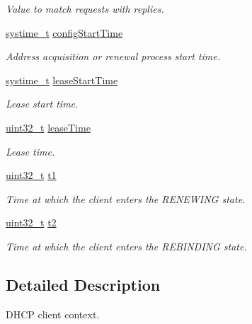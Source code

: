 \begin{DoxyCompactItemize}
\begin{DoxyCompactList}\small\item\em Value to match requests with replies. \end{DoxyCompactList}\item 
\hyperlink{compiler__port_8h_ae3e32a98d431a02106616da3071832dd}{systime\+\_\+t} \hyperlink{struct__DhcpClientContext_a41ea81e09c5f9460efd67b8f4cda1bb4}{config\+Start\+Time}
\begin{DoxyCompactList}\small\item\em Address acquisition or renewal process start time. \end{DoxyCompactList}\item 
\hyperlink{compiler__port_8h_ae3e32a98d431a02106616da3071832dd}{systime\+\_\+t} \hyperlink{struct__DhcpClientContext_ad5e4725e9e2c1116a5a48ec2c5154f07}{lease\+Start\+Time}
\begin{DoxyCompactList}\small\item\em Lease start time. \end{DoxyCompactList}\item 
\hyperlink{stdint_8h_a435d1572bf3f880d55459d9805097f62}{uint32\+\_\+t} \hyperlink{struct__DhcpClientContext_a451fc8aeafdc0b846e73a7cc8234f75d}{lease\+Time}
\begin{DoxyCompactList}\small\item\em Lease time. \end{DoxyCompactList}\item 
\hyperlink{stdint_8h_a435d1572bf3f880d55459d9805097f62}{uint32\+\_\+t} \hyperlink{struct__DhcpClientContext_a9b95db689cef6cc75d7ff2edba47843d}{t1}
\begin{DoxyCompactList}\small\item\em Time at which the client enters the R\+E\+N\+E\+W\+I\+NG state. \end{DoxyCompactList}\item 
\hyperlink{stdint_8h_a435d1572bf3f880d55459d9805097f62}{uint32\+\_\+t} \hyperlink{struct__DhcpClientContext_a733de356e46bb2553d97c81b8f8c7a5f}{t2}
\begin{DoxyCompactList}\small\item\em Time at which the client enters the R\+E\+B\+I\+N\+D\+I\+NG state. \end{DoxyCompactList}\end{DoxyCompactItemize}


\subsection{Detailed Description}
D\+H\+CP client context. 

